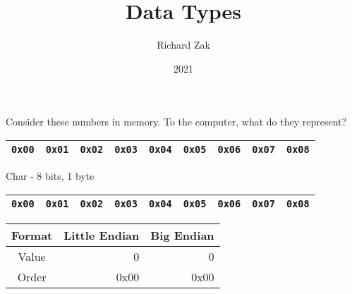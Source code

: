 \documentclass{beamer}
\title{Data Types}
\author{Richard Zak}
\institute{UMBC}
\date{2021}
\begin{document}

\begin{frame}
Consider these numbers in memory. To the computer, what do they represent?
\begin{table}[]
\begin{tabular}{|l|l|l|l|l|l|l|l|l|}
\hline
 \texttt{0x00} & \texttt{0x01} & \texttt{0x02} & \texttt{0x03} & \texttt{0x04} & \texttt{0x05} & \texttt{0x06} & \texttt{0x07} &
 \texttt{0x08} \\
\hline 
\end{tabular}
\end{table}
\end{frame}

\begin{frame}{Char - 8 bits, 1 byte}

\begin{table}[]
\begin{tabular}{|l|l|l|l|l|l|l|l|l|}
\hline
 \color{red}\texttt{0x00} & \texttt{0x01} & \texttt{0x02} & \texttt{0x03} & \texttt{0x04} & \texttt{0x05} & \texttt{0x06} & \texttt{0x07} &
 \texttt{0x08} \\
\hline 
\end{tabular}
\end{table}

\begin{table}[]
\begin{tabular}{c r r}
Format & Little Endian & Big Endian \\
\hline
Value &  0   & 0 \\
Order & 0x00 & 0x00
\end{tabular}
\end{table}

\end{frame}
\end{document}
